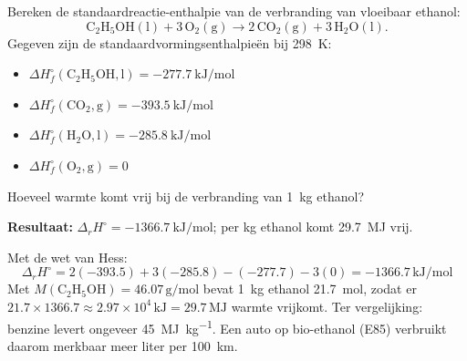 \begin{oefening}
Bereken de standaardreactie-enthalpie van de verbranding van vloeibaar ethanol:
\[
\mathrm{C_2H_5OH(l) + 3\,O_2(g) \rightarrow 2\,CO_2(g) + 3\,H_2O(l)}.
\]
Gegeven zijn de standaardvormingsenthalpie\"en bij \SI{298}{\kelvin}:
\begin{itemize}
\item $\Delta H_f^\circ(\mathrm{C_2H_5OH,l}) = \SI{-277.7}{\kilo\joule\per\mole}$
\item $\Delta H_f^\circ(\mathrm{CO_2,g}) = \SI{-393.5}{\kilo\joule\per\mole}$
\item $\Delta H_f^\circ(\mathrm{H_2O,l}) = \SI{-285.8}{\kilo\joule\per\mole}$
\item $\Delta H_f^\circ(\mathrm{O_2,g}) = 0$
\end{itemize}
Hoeveel warmte komt vrij bij de verbranding van \SI{1}{\kilogram} ethanol?    
\end{oefening}
\begin{oplossing}
\textbf{Resultaat:} $\Delta_r H^\circ = \SI{-1366.7}{\kilo\joule\per\mole}$; per kg ethanol komt \SI{29.7}{\mega\joule} vrij.

Met de wet van Hess:
\[
\Delta_r H^\circ = 2(-393.5) + 3(-285.8) - (-277.7) - 3(0) = -1366.7\,\mathrm{kJ/mol}
\]
Met $M(\mathrm{C_2H_5OH}) = 46.07\,\mathrm{g/mol}$ bevat \SI{1}{\kilogram} ethanol \SI{21.7}{\mole}, zodat er $21.7 \times 1366.7 \approx 2.97\times10^{4}\,\mathrm{kJ} = 29.7\,\mathrm{MJ}$ warmte vrijkomt. Ter vergelijking: benzine levert ongeveer \SI{45}{\mega\joule\per\kilogram}. Een auto op bio-ethanol (E85) verbruikt daarom merkbaar meer liter per 100~km.
\end{oplossing}


